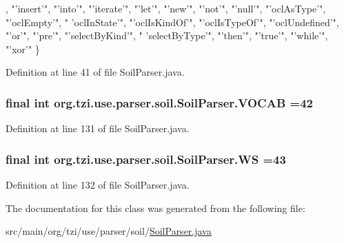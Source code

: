 \begin{DoxyCode}
      , \textcolor{stringliteral}{"'insert'"}, \textcolor{stringliteral}{"'into'"}, \textcolor{stringliteral}{"'iterate'"}, \textcolor{stringliteral}{"'let'"}, \textcolor{stringliteral}{"'new'"}, \textcolor{stringliteral}{"'not'"}, \textcolor{stringliteral}{"'null'"}, \textcolor{stringliteral}{"'oclAsType'"}, \textcolor{stringliteral}{"'oclEmpty'"}, \textcolor{stringliteral}{"
      'oclInState'"}, \textcolor{stringliteral}{"'oclIsKindOf'"}, \textcolor{stringliteral}{"'oclIsTypeOf'"}, \textcolor{stringliteral}{"'oclUndefined'"}, \textcolor{stringliteral}{"'or'"}, \textcolor{stringliteral}{"'pre'"}, \textcolor{stringliteral}{"'selectByKind'"}, \textcolor{stringliteral}{"
      'selectByType'"}, \textcolor{stringliteral}{"'then'"}, \textcolor{stringliteral}{"'true'"}, \textcolor{stringliteral}{"'while'"}, \textcolor{stringliteral}{"'xor'"}
    \}
\end{DoxyCode}


Definition at line 41 of file Soil\-Parser.\-java.

\hypertarget{classorg_1_1tzi_1_1use_1_1parser_1_1soil_1_1_soil_parser_a4085cffd94104a089eb27e0a14428cf2}{
\subsubsection[{V\-O\-C\-A\-B}]{\setlength{\rightskip}{0pt plus 5cm}final int org.\-tzi.\-use.\-parser.\-soil.\-Soil\-Parser.\-V\-O\-C\-A\-B =42\hspace{0.3cm}{\ttfamily [static]}}}\label{classorg_1_1tzi_1_1use_1_1parser_1_1soil_1_1_soil_parser_a4085cffd94104a089eb27e0a14428cf2}


Definition at line 131 of file Soil\-Parser.\-java.

\hypertarget{classorg_1_1tzi_1_1use_1_1parser_1_1soil_1_1_soil_parser_a34f858d8d0f2178fb48c8b77e77db824}{
\subsubsection[{W\-S}]{\setlength{\rightskip}{0pt plus 5cm}final int org.\-tzi.\-use.\-parser.\-soil.\-Soil\-Parser.\-W\-S =43\hspace{0.3cm}{\ttfamily [static]}}}\label{classorg_1_1tzi_1_1use_1_1parser_1_1soil_1_1_soil_parser_a34f858d8d0f2178fb48c8b77e77db824}


Definition at line 132 of file Soil\-Parser.\-java.



The documentation for this class was generated from the following file\-:\begin{DoxyCompactItemize}
\item 
src/main/org/tzi/use/parser/soil/\hyperlink{_soil_parser_8java}{Soil\-Parser.\-java}\end{DoxyCompactItemize}
